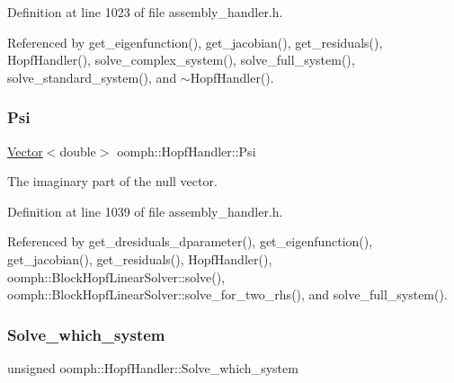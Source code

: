 Definition at line 1023 of file assembly\+\_\+handler.\+h.



Referenced by get\+\_\+eigenfunction(), get\+\_\+jacobian(), get\+\_\+residuals(), Hopf\+Handler(), solve\+\_\+complex\+\_\+system(), solve\+\_\+full\+\_\+system(), solve\+\_\+standard\+\_\+system(), and $\sim$\+Hopf\+Handler().

\mbox{\label{classoomph_1_1HopfHandler_a9f4d4f9e8962f1cd666df8de85a37d2a}} 
\subsubsection{\texorpdfstring{Psi}{Psi}}
{\footnotesize\ttfamily \hyperlink{classoomph_1_1Vector}{Vector}$<$double$>$ oomph\+::\+Hopf\+Handler\+::\+Psi\hspace{0.3cm}{\ttfamily [private]}}



The imaginary part of the null vector. 



Definition at line 1039 of file assembly\+\_\+handler.\+h.



Referenced by get\+\_\+dresiduals\+\_\+dparameter(), get\+\_\+eigenfunction(), get\+\_\+jacobian(), get\+\_\+residuals(), Hopf\+Handler(), oomph\+::\+Block\+Hopf\+Linear\+Solver\+::solve(), oomph\+::\+Block\+Hopf\+Linear\+Solver\+::solve\+\_\+for\+\_\+two\+\_\+rhs(), and solve\+\_\+full\+\_\+system().

\mbox{\label{classoomph_1_1HopfHandler_aa3d4d806a328a460edaae915670edad3}} 
\subsubsection{\texorpdfstring{Solve\+\_\+which\+\_\+system}{Solve\_which\_system}}
{\footnotesize\ttfamily unsigned oomph\+::\+Hopf\+Handler\+::\+Solve\+\_\+which\+\_\+system\hspace{0.3cm}{\ttfamily [private]}}



